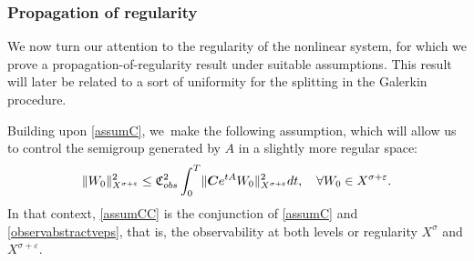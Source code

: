 \documentclass[11pt]{article}
\theoremstyle{definition}
\let\veps\varepsilon
\newcommand{\bC}{\boldsymbol{C}}
\providecommand{\norm}[1]{\lVert#1\rVert}
\begin{document}
\subsubsection{Propagation of regularity} We now turn our attention to the regularity of the nonlinear system, for which we prove a propagation-of-regularity result under suitable assumptions. This result will later be related to a sort of uniformity for the splitting in the Galerkin procedure.

Building upon \cref{assumC}, we~make the following assumption, which will allow us to control the semigroup generated by $A$ in a slightly more regular space:
\begin{align}\label{observabstractveps}
\norm{W_0}_{X^{\sigma+\veps}}^2\leq \mathfrak{C}_{\textup{obs}}^2\int_0^T \norm{\bC e^{tA}W_0}_{X^{\sigma+\veps}}^2dt,\quad \forall W_0\in X^{\sigma+\veps}.
\end{align}
In that context, \cref{assumCC} is the conjunction of \cref{assumC} and \eqref{observabstractveps}, that is, the observability at both levels or regularity $X^{\sigma}$ and $X^{\sigma+\veps}$.
\end{document}
